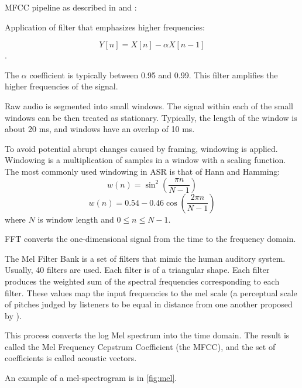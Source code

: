 MFCC pipeline as described in  and :

\begin{enumerate}
	 Application of filter that emphasizes higher frequencies:
	
	\begin{equation}
	Y[n] = X[n] - \alpha X[n-1]
	\end{equation}.
	
	The $\alpha$ coefficient is typically between 0.95 and 0.99.  This filter amplifies the higher frequencies of the signal.
	
	 Raw audio is segmented into small windows. The signal within each of the small windows can be then treated as stationary. Typically, the length of the window is about 20 ms, and windows have an overlap of 10 ms.
	
	 To avoid potential abrupt changes caused by framing, windowing is applied. Windowing is a multiplication of samples in a window with a scaling function. The most commonly used windowing in ASR is that of Hann and Hamming:
	\begin{equation}
	w(n) = \sin^2{\left( \frac{\pi n}{N - 1} \right)}
	\end{equation}
	\begin{equation}
	w(n) = 0.54 - 0.46 \cos{\left(\frac{2\pi n}{N - 1}\right)}
	\end{equation}
	where $N$ is window length and $0 \leq n \leq N - 1$.
	
	 FFT converts the one-dimensional signal from the time to the frequency domain.
	
	The Mel Filter Bank is a set of filters that mimic the human auditory system. Usually, 40 filters are used. Each filter is of a triangular shape. Each filter produces the weighted sum of the spectral frequencies corresponding to each filter. These values map the input frequencies to the mel scale (a perceptual scale of pitches judged by listeners to be equal in distance from one another proposed by ).
	
	 This process converts the log Mel spectrum into the time domain. The result is called the Mel Frequency Cepstrum Coefficient (the MFCC), and the set of coefficients is called acoustic vectors.
\end{enumerate}

An example of a mel-spectrogram is in \cref{fig:mel}.

